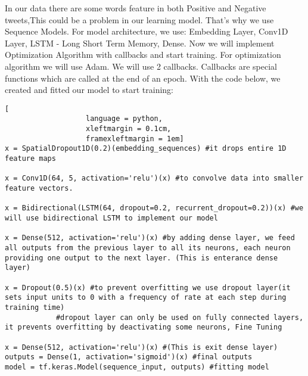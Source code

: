 In our data there are some words feature in both Positive and Negative tweets,This could be a problem in our learning model. That's why we use Sequence Models. For model architecture, we use: Embedding Layer, Conv1D Layer,  LSTM - Long Short Term Memory, Dense. Now we will implement Optimization Algorithm with callbacks and start training. For optimization algorithm we will use Adam. We will use 2 callbacks. Callbacks are special functions which are called at the end of an epoch. 
With the code below, we created and fitted our model to start training:
\begin{lstlisting}[
                   language = python,
                   xleftmargin = 0.1cm,
                   framexleftmargin = 1em]
x = SpatialDropout1D(0.2)(embedding_sequences) #it drops entire 1D feature maps

x = Conv1D(64, 5, activation='relu')(x) #to convolve data into smaller feature vectors.

x = Bidirectional(LSTM(64, dropout=0.2, recurrent_dropout=0.2))(x) #we will use bidirectional LSTM to implement our model

x = Dense(512, activation='relu')(x) #by adding dense layer, we feed all outputs from the previous layer to all its neurons, each neuron providing one output to the next layer. (This is enterance dense layer)

x = Dropout(0.5)(x) #to prevent overfitting we use dropout layer(it sets input units to 0 with a frequency of rate at each step during training time)
			#dropout layer can only be used on fully connected layers, it prevents overfitting by deactivating some neurons, Fine Tuning

x = Dense(512, activation='relu')(x) #(This is exit dense layer)
outputs = Dense(1, activation='sigmoid')(x) #final outputs
model = tf.keras.Model(sequence_input, outputs) #fitting model
 \end{lstlisting}
                           
